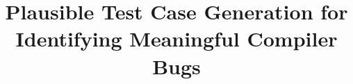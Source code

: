 



\title{Plausible Test Case Generation for Identifying Meaningful Compiler Bugs}

\maketitle















\printbibliography

